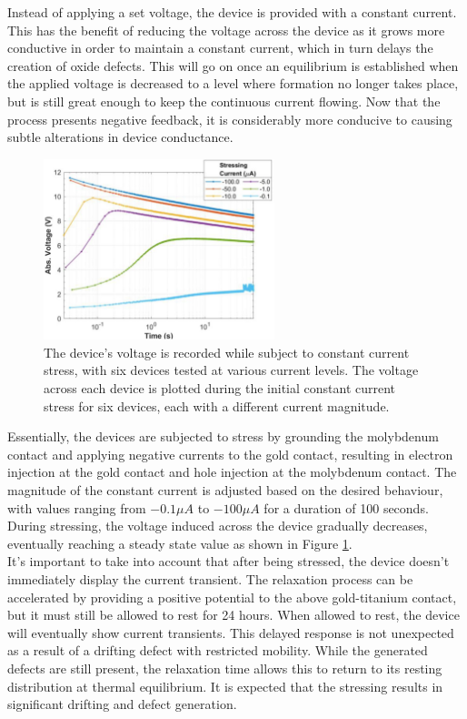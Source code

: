 \noindent Instead of applying a set voltage, the device is provided with a constant current. This has the benefit of reducing the voltage across the device as it grows more conductive in order to maintain a constant current, which in turn delays the creation of oxide defects. This will go on once an equilibrium is established when the applied voltage is decreased to a level where formation no longer takes place, but is still great enough to keep the continuous current flowing. Now that the process presents negative feedback, it is considerably more conducive to causing subtle alterations in device conductance. \\

\begin{figure}[htbp!] 
\centering    
\includegraphics[width=0.6\textwidth]{Chapter3/Figs/3d.png}
\caption[Response of devices to different magnitudes of stressing currents.]{The device's voltage is recorded while subject to constant current stress, with six devices tested at various current levels. The voltage across each device is plotted during the initial constant current stress for six devices, each with a different current magnitude.}
\label{fig:3d}
\end{figure}

\noindent Essentially, the devices are subjected to stress by grounding the molybdenum contact and applying negative currents to the gold contact, resulting in electron injection at the gold contact and hole injection at the molybdenum contact. The magnitude of the constant current is adjusted based on the desired behaviour, with values ranging from $-0.1\mu A$ to $-100\mu A$ for a duration of 100 seconds. During stressing, the voltage induced across the device gradually decreases, eventually reaching a steady state value as shown in Figure \ref{fig:3d}.\\

\noindent It's important to take into account that after being stressed, the device doesn't immediately display the current transient. The relaxation process can be accelerated by providing a positive potential to the above gold-titanium contact, but it must still be allowed to rest for 24 hours. When allowed to rest, the device will eventually show current transients. This delayed response is not unexpected as a result of a drifting defect with restricted mobility. While the generated defects are still present, the relaxation time allows this to return to its resting distribution at thermal equilibrium. It is expected that the stressing results in significant drifting and defect generation.


